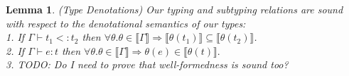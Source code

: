 \documentclass[11pt]{article}
\newtheorem{lemma}[theorem]{Lemma}
\newcommand{\bind}{\hspace{0.05em}{:}\hspace{0.05em}} %
\newcommand{\col}{\mathbin{:}}       %
\newcommand{\lb}{\llbracket}         %
\newcommand{\rb}{\rrbracket}         %
\begin{document}
\begin{comment}
\begin{lemma}{(Declarative Entailments) Our entailment judgement is sound with respect to the denotations of the environment: If
$\Gamma \vdash_e c$, then $\forall\, \theta.\, \theta \in \lb\Gamma\rb \Rightarrow \varnothing \vdash_e \theta(c)$.}
\label{decl-impl}
\end{lemma}

\begin{proof} %
We proceed by induction on (the length of) $\Gamma$. In the base case $\Gamma = \varnothing$, so $\theta(c) = c$ and the result is vacuous.
In the inductive case, suppose we have $\Gamma', x\bind t \vdash_e c$.
By inversion of {\sc Ent-Ext}, we must have that $t \equiv b\{x\col p\}$ and $\Gamma' \vdash_e \forall\,x\bind b.\, p \Rightarrow c$. By the inductive hypothesis, for any $\theta' \in \lb\Gamma'\rb$, $\varnothing \vdash_e \theta'(\forall\, x\bind b.\, p \Rightarrow c)$, or equivalently, $\varnothing \vdash_e \forall\, x\bind b.\, \theta'(p) \Rightarrow \theta'(c)$. By inversion of {\sc Ent-EmpI}, we have for all $\theta'' = (x\mapsto e) \in \lb b\{x\col p\}\rb$, $\varnothing \vdash_e \theta'(c)[e/x]$. Therefore, for any $\theta \in \lb \Gamma', x\bind t\rb$, if we write $\theta=(\theta', x\mapsto e)$ we have $\varnothing \vdash_e \theta(c)$.

\end{proof}
\end{comment}

\begin{lemma}{(Type Denotations) Our typing and subtyping relations are sound with respect to the denotational semantics of our types:\\
1. If $\Gamma \vdash t_1 <: t_2$ then $\forall \theta. \theta \in \lb \Gamma \rb \Rightarrow \lb\theta(t_1)\rb \subseteq \lb\theta(t_2)\rb$.\\
2. If $\Gamma \vdash e : t$ then $\forall \theta. \theta \in \lb \Gamma \rb \Rightarrow \theta(e) \in \lb\theta(t)\rb.$
}\label{type-denote}\\
3. TODO: Do I need to prove that well-formedness is sound too?
\end{lemma}
\end{document}
